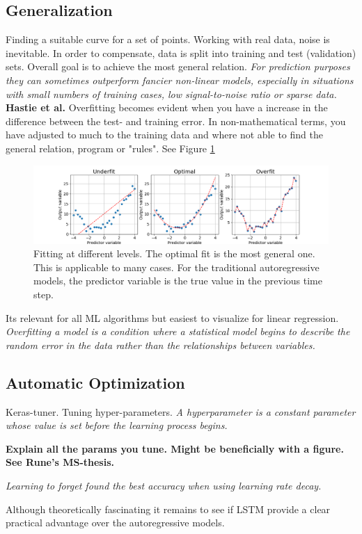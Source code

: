 \subsection{Generalization} \label{sec:generalization}
Finding a suitable curve for a set of points. Working with real data, noise is inevitable. In order to compensate, data is split into training and test (validation) sets. %
Overall goal is to achieve the most general relation. \textit{For prediction purposes they can sometimes outperform fancier non-linear models, especially in situations with small numbers of training cases, low signal-to-noise ratio or sparse data.} \textbf{Hastie et al.} Overfitting becomes evident when you have a increase in the difference between the test- and training error. In non-mathematical terms, you have adjusted to much to the training data and where not able to find the general relation, program or "rules". See Figure \ref{fig:linreg_overfitting} 

\begin{figure}[hp]
    \centering
    \includegraphics[scale = 0.4]{Chapter3_Method/figs/generalization.png}
    \caption{Fitting at different levels. The optimal fit is the most general one. This is applicable to many cases. For the traditional autoregressive models, the predictor variable is the true value in the previous time step. }
    \label{fig:linreg_overfitting}
\end{figure}

Its relevant for all ML algorithms but easiest to visualize for linear regression.
\textit{Overfitting a model is a condition where a statistical model begins to describe the random error in the data rather than the relationships between variables.}

\subsection{Automatic Optimization} \label{sec:hyperparam_tuning}
Keras-tuner. Tuning hyper-parameters.
\textit{A hyperparameter is a constant parameter whose value is set before the learning process begins.}

\textbf{Explain all the params you tune. Might be beneficially with a figure. See Rune's MS-thesis.}

\textit{Learning to forget found the best accuracy when using learning rate decay.}


Although theoretically fascinating it remains to see if LSTM provide a clear practical advantage over the autoregressive models.


